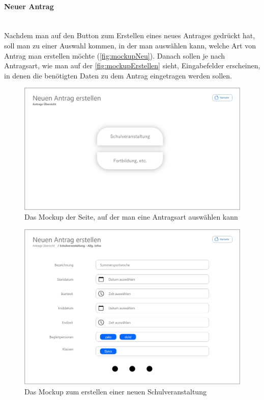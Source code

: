 \paragraph{Neuer Antrag}
~\\
Nachdem man auf den Button zum Erstellen eines neues Antrages gedrückt hat, soll man zu einer Auswahl kommen, in der man auswählen kann, welche Art von Antrag man erstellen möchte (\autoref{fig:mockupNeu}). Danach sollen je nach Antragsart, wie man auf der \autoref{fig:mockupErstellen} sieht, Eingabefelder erscheinen, in denen die benötigten Daten zu dem Antrag eingetragen werden sollen.
\begin{figure}[H]
	\centering
	\includegraphics[width=1\linewidth]{images/Mockup-Neuer-Antrag}
	\caption[Mockup neuer Antrag]{Das Mockup der Seite, auf der man eine Antragsart auswählen kann}
	\label{fig:mockupNeu}
\end{figure}
\begin{figure}[H]
	\centering
	\includegraphics[width=1\linewidth]{images/Mockup-Antrag-erstellen}
	\caption[Mockup Antrag erstellen]{Das Mockup zum erstellen einer neuen Schulveranstaltung}
	\label{fig:mockupErstellen}
\end{figure}

